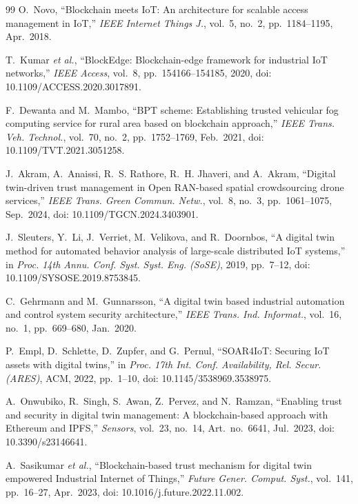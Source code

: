\documentclass{ieeeaccess}
\begin{document}
\begin{thebibliography}{99}
O.~Novo,
``Blockchain meets IoT: An architecture for scalable access management
in IoT,''
\textit{IEEE Internet Things J.}, vol.~5, no.~2,
pp.~1184--1195, Apr.~2018.

T.~Kumar \textit{et al.},
``BlockEdge: Blockchain-edge framework for industrial IoT networks,''
\textit{IEEE Access}, vol.~8, pp.~154166--154185, 2020,
doi: 10.1109/ACCESS.2020.3017891.

F.~Dewanta and M.~Mambo,
``BPT scheme: Establishing trusted vehicular fog computing service
for rural area based on blockchain approach,''
\textit{IEEE Trans. Veh. Technol.}, vol.~70, no.~2,
pp.~1752--1769, Feb.~2021,
doi: 10.1109/TVT.2021.3051258.

J.~Akram, A.~Anaissi, R.~S. Rathore, R.~H. Jhaveri, and A.~Akram,
``Digital twin-driven trust management in Open RAN-based spatial
crowdsourcing drone services,''
\textit{IEEE Trans. Green Commun. Netw.}, vol.~8, no.~3,
pp.~1061--1075, Sep.~2024,
doi: 10.1109/TGCN.2024.3403901.

J.~Sleuters, Y.~Li, J.~Verriet, M.~Velikova, and R.~Doornbos,
``A digital twin method for automated behavior analysis of
large-scale distributed IoT systems,''
in \textit{Proc. 14th Annu. Conf. Syst. Syst. Eng. (SoSE)},
2019, pp.~7--12, doi: 10.1109/SYSOSE.2019.8753845.

C.~Gehrmann and M.~Gunnarsson,
``A digital twin based industrial automation and control system
security architecture,''
\textit{IEEE Trans. Ind. Informat.}, vol.~16, no.~1,
pp.~669--680, Jan.~2020.

P.~Empl, D.~Schlette, D.~Zupfer, and G.~Pernul,
``SOAR4IoT: Securing IoT assets with digital twins,''
in \textit{Proc. 17th Int. Conf. Availability, Rel. Secur. (ARES)},
ACM, 2022, pp.~1--10, doi: 10.1145/3538969.3538975.

 A.~Onwubiko, R.~Singh, S.~Awan, Z.~Pervez, and N.~Ramzan, ``Enabling trust and security in digital twin management: A blockchain-based approach with Ethereum and IPFS,'' \emph{Sensors}, vol.~23, no.~14, Art.~no.~6641, Jul.~2023, doi: 10.3390/s23146641.

 A.~Sasikumar \emph{et al.}, ``Blockchain-based trust mechanism for digital twin empowered Industrial Internet of Things,'' \emph{Future Gener. Comput. Syst.}, vol.~141, pp.~16--27, Apr.~2023, doi: 10.1016/j.future.2022.11.002.


\end{thebibliography}
\end{document}
